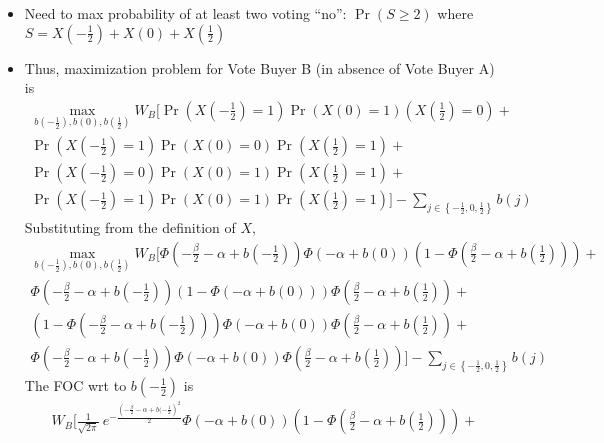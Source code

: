 \documentclass[12pt]{article}
\begin{document}
\begin{itemize}
\begin{itemize}
			\item Need to max probability of at least two voting ``no'': $\Pr(S \geq 2)$ where $S = X\left(-\frac{1}{2}\right) + X\left(0\right) + X\left(\frac{1}{2}\right)$
			\item Thus, maximization problem for Vote Buyer B (in absence of Vote Buyer A) is
			  \begin{multline}
			    \max_{b\left(-\frac{1}{2}\right), b\left(0\right), b\left(\frac{1}{2}\right)} 
					W_B \biggl[ \Pr\left(X\left(-\frac{1}{2}\right)=1\right)\Pr\left(X\left(0\right)=1\right)\left(X\left(\frac{1}{2}\right)=0\right)  + \\
					\Pr\left(X\left(-\frac{1}{2}\right)=1\right)\Pr\left(X\left(0\right)=0\right)\Pr\left(X\left(\frac{1}{2}\right)=1\right) + \\
					\Pr\left(X\left(-\frac{1}{2}\right)=0\right)\Pr\left(X\left(0\right)=1\right)\Pr\left(X\left(\frac{1}{2}\right)=1\right) + \\
					\Pr\left(X\left(-\frac{1}{2}\right)=1\right)\Pr\left(X\left(0\right)=1\right)\Pr\left(X\left(\frac{1}{2}\right)=1\right) \biggr] - \sum_{j\in \left\{-\frac{1}{2}, 0,\frac{1}{2}\right\}} b(j)
				\end{multline}
			Substituting from the definition of $X$,
			  \begin{multline}
			    \max_{b\left(-\frac{1}{2}\right), b\left(0\right), b\left(\frac{1}{2}\right)} 
					W_B \biggl[ \Phi\left(-\frac{\beta}{2} - \alpha + b(-\frac{1}{2}) \right)\Phi\left(- \alpha + b(0) \right)\left(1-\Phi\left(\frac{\beta}{2} - \alpha + b(\frac{1}{2}) \right)\right)  + \\
					\Phi\left(-\frac{\beta}{2} - \alpha + b(-\frac{1}{2}) \right)\left(1-\Phi\left(- \alpha + b(0) \right)\right)\Phi\left(\frac{\beta}{2} - \alpha + b(\frac{1}{2}) \right) + \\
					\left(1-\Phi\left(-\frac{\beta}{2} - \alpha + b(-\frac{1}{2}) \right)\right)\Phi\left(- \alpha + b(0) \right)\Phi\left(\frac{\beta}{2} - \alpha + b(\frac{1}{2}) \right) + \\
					\Phi\left(-\frac{\beta}{2} - \alpha + b(-\frac{1}{2}) \right)\Phi\left(- \alpha + b(0) \right)\Phi\left(\frac{\beta}{2} - \alpha + b(\frac{1}{2}) \right) \biggr] - \sum_{j\in \left\{-\frac{1}{2}, 0,\frac{1}{2}\right\}} b(j)
				\end{multline}
			The FOC wrt to $b\left(-\frac{1}{2}\right)$ is
				\begin{multline}
					W_B \biggl[ \frac{1}{\sqrt{2\pi}} \: e^{- \frac{\left(-\frac{\beta}{2} - \alpha + b(-\frac{1}{2}\right)^2}{2}} \Phi\left(- \alpha + b(0) \right)\left(1-\Phi\left(\frac{\beta}{2} - \alpha + b(\frac{1}{2}) \right)\right)  + \\

\end{multline}
\end{itemize}
\end{itemize}
\end{document}
